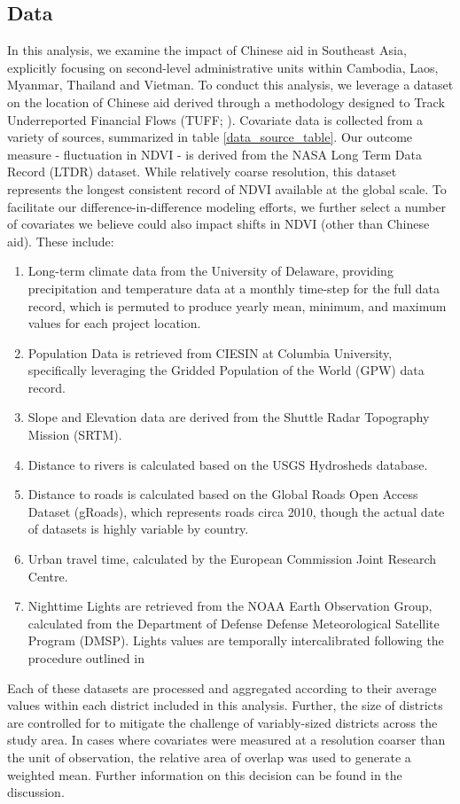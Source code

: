 \subsection{Data}

In this analysis, we examine the impact of Chinese aid in Southeast Asia, explicitly focusing on second-level administrative units within Cambodia, Laos, Myanmar, Thailand and Vietman.
To conduct this analysis, we leverage a dataset on the location of Chinese aid derived through a methodology designed to Track Underreported Financial Flows (TUFF; \cite{strange_tracking_2015}).
Covariate data is collected from a variety of sources, summarized in table \ref{data_source_table}.
Our outcome measure - fluctuation in NDVI - is derived from the NASA Long Term Data Record (LTDR) dataset.
While relatively coarse resolution, this dataset represents the longest consistent record of NDVI available at the global scale.
To facilitate our difference-in-difference modeling efforts, we further select a number of covariates we believe could also impact shifts in NDVI (other than Chinese aid).
These include:
\begin{enumerate}
\item{Long-term climate data from the University of Delaware, providing precipitation and temperature data at a monthly time-step for the full data record, which is permuted to produce yearly mean, minimum, and maximum values for each project location.}
\item{Population Data is retrieved from CIESIN at Columbia University, specifically leveraging the Gridded Population of the World (GPW) data record.}
\item{Slope and Elevation data are derived from the Shuttle Radar Topography Mission (SRTM).}
\item{Distance to rivers is calculated based on the USGS Hydrosheds database.}
\item{Distance to roads is calculated based on the Global Roads Open Access Dataset (gRoads), which represents roads circa 2010, though the actual date of datasets is highly variable by country.}
\item{Urban travel time, calculated by the European Commission Joint Research Centre.}
\item{Nighttime Lights are retrieved from the NOAA Earth Observation Group, calculated from the Department of Defense Defense Meteorological Satellite Program (DMSP).  Lights values are temporally intercalibrated following the procedure outlined in \cite{weng_global_2014}}
\end{enumerate}
Each of these datasets are processed and aggregated according to their average values within each district included in this analysis.  
Further, the size of districts are controlled for to mitigate the challenge of variably-sized districts across the study area.
In cases where covariates were measured at a resolution coarser than the unit of observation, the relative area of overlap was used to generate a weighted mean.
Further information on this decision can be found in the discussion.










